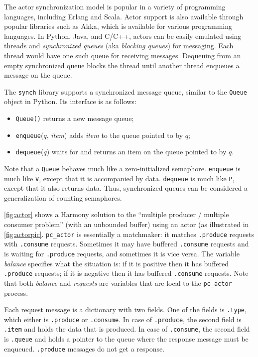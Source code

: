 \documentclass{report}
\begin{document}
The actor synchronization model is popular in a variety of programming
languages, including Erlang and Scala.  Actor support is also available
through popular libraries such as Akka, which is available for various
programming languages.  In Python, Java, and C/C++,
actors can be easily emulated using threads and \emph{synchronized queues}
%
(aka \emph{blocking queues})
%
for messaging.
Each thread would have one such queue for receiving messages.
Dequeuing from an empty synchronized queue blocks the thread until
another thread enqueues a message on the queue.

The \texttt{synch} library supports a synchronized message queue,
similar to the \texttt{Queue} object in Python.
Its interface is as follows:
\begin{itemize}
\item \texttt{Queue()} returns a new message queue;
\item \texttt{enqueue}($q$, \textit{item}) adds \textit{item} to the queue pointed to by $q$;
\item \texttt{dequeue}($q$) waits for and returns an item on the queue pointed to by $q$.
\end{itemize}

Note that a \texttt{Queue} behaves much like a zero-initialized semaphore.
\texttt{enqueue} is much like \texttt{V}, except that it is accompanied by data.
\texttt{dequeue} is much like \texttt{P}, except that it also returns data.
Thus, synchronized queues can be considered a generalization of counting semaphores.

\autoref{fig:actor} shows a Harmony solution to the
``multiple producer / multiple consumer problem'' (with an unbounded buffer)
using an actor (as illustrated in \autoref{fig:actorpic}.
\texttt{pc\_actor} is essentially a matchmaker: it matches
\texttt{.produce} requests with \texttt{.consume} requests.
Sometimes it may have buffered \texttt{.consume} requests and is waiting for
\texttt{.produce} requests, and sometimes it is vice versa.
The variable \textit{balance} specifies what the situation is: if it is positive
then it has buffered \texttt{.produce} requests;
if it is negative
then it has buffered \texttt{.consume} requests.
Note that both \textit{balance} and \textit{requests} are variables that are
local to the \texttt{pc\_actor} process.

Each request message is a dictionary with two fields.  One of the fields is
\texttt{.type}, which either is \texttt{.produce} or \texttt{.consume}.
In case of \texttt{.produce}, the second field is \texttt{.item} and holds
the data that is produced.
In case of \texttt{.consume}, the second field is \texttt{.queue} and holds
a pointer to the queue where the response message must be enqueued.
\texttt{.produce} messages do not get a response.
\end{document}
